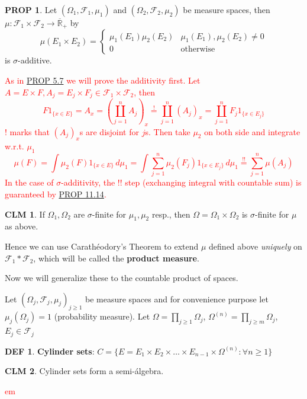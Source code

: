 \documentclass[hidelinks]{article}
\theoremstyle{definition}
\newtheorem*{defin}{DEF}
\theoremstyle{dotless}
\newtheorem{proposition}{PROP}[section]
\newtheorem{claim}{CLM}[section]
\theoremstyle{remark}
\begin{document}
\begin{proposition}
Let $(\Omega_1,\mathscr{F}_1,\mu_1)$ and $(\Omega_2,\mathscr{F}_2,\mu_2)$ be measure spaces, then $\mu:\mathscr{F}_1\times\mathscr{F}_2\to\overline{\mathbb{R}}_+$ by
\[\mu(E_1\times E_2)=\begin{cases}
  \mu_1(E_1)\mu_2(E_2) & \mu_1(E_1),\mu_2(E_2)\neq0\\
  0 & \textrm{otherwise}
  \end{cases}\]
is $\sigma$-additive.
\end{proposition}
\textcolor{red}{As in \hyperref[PROP 5.7]{PROP 5.7} we will prove the additivity first.\newline
Let $A=E\times F,A_j=E_j\times F_j\in\mathscr{F}_1\times\mathscr{F}_2$, then
\[F1_{\{x\in E\}}=A_x=(\coprod_{j=1}^nA_j)_x\overset{!}{=}\coprod_{j=1}^n(A_j)_x=\coprod_{j=1}^nF_j1_{\{x\in E_j\}}\]
! marks that $(A_j)_x$s are disjoint for $j$s. Then take $\mu_2$ on both side and integrate w.r.t. $\mu_1$
\[\mu(F)=\int\mu_2(F)1_{\{x\in E\}}\,d\mu_1=\int\sum_{j=1}^n\mu_2(F_j)1_{\{x\in E_j\}}\,d\mu_1\overset{!!}{=}\sum_{j=1}^n\mu(A_j)\]
In the case of $\sigma$-additivity, the !! step (exchanging integral with countable sum) is guaranteed by \hyperref[PROP 11.14]{PROP 11.14}.}

\begin{claim}
If $\Omega_1,\Omega_2$ are $\sigma$-finite for $\mu_1,\mu_2$ resp., then $\Omega=\Omega_1\times\Omega_2$ is $\sigma$-finite for $\mu$ as above.
\end{claim}

\bigbreak

Hence we can use Carathéodory's Theorem to extend $\mu$ defined above \emph{uniquely} on $\mathscr{F}_1\ast\mathscr{F}_2$, which will be called the \textbf{product measure}.\bigbreak

Now we will generalize these to the countable product of spaces.\medbreak

Let $(\Omega_j,\mathscr{F}_j,\mu_j)_{j\geq1}$ be measure spaces and for convenience purpose let $\mu_j(\Omega_j)=1$ (probability measure). Let $\Omega=\prod\limits_{j\geq1}\Omega_j$, $\Omega^{(n)}=\prod\limits_{j\geq m}\Omega_j$, $E_j\in\mathscr{F}_j$

\begin{defin}
\textbf{Cylinder sets}: $C=\{E=E_1\times E_2\times\dots\times E_{n-1}\times\Omega^{(n)}:\forall n\geq1\}$
\end{defin}

\begin{claim}
Cylinder sets form a semi-álgebra.
\end{claim}
\textcolor{red}{em}
\end{document}
